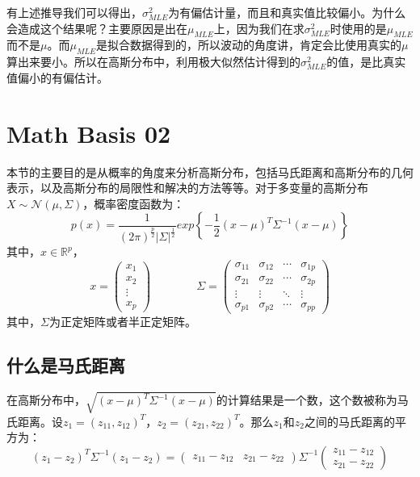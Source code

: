\documentclass[a4paper]{article}
\numberwithin{equation}{section}
\begin{document}
有上述推导我们可以得出，$\sigma^2_{MLE}$为有偏估计量，而且和真实值比较偏小。为什么会造成这个结果呢？主要原因是出在$\mu_{MLE}$上，因为我们在求$\sigma^2_{MLE}$时使用的是$\mu_{MLE}$而不是$\mu$。而$\mu_{MLE}$是拟合数据得到的，所以波动的角度讲，肯定会比使用真实的$\mu$算出来要小。所以在高斯分布中，利用极大似然估计得到的$\sigma^2_{MLE}$的值，是比真实值偏小的有偏估计。

\section{Math Basis 02 }

本节的主要目的是从概率的角度来分析高斯分布，包括马氏距离和高斯分布的几何表示，以及高斯分布的局限性和解决的方法等等。对于多变量的高斯分布$X\sim \mathcal{N}(\mu,\Sigma)$，概率密度函数为：
\begin{equation}
    p(x)=\frac{1}{(2\pi)^{\frac{p}{2}}|\Sigma|^{\frac{1}{2}}}exp\left\{ -\frac{1}{2}(x-\mu)^T\Sigma^{-1}(x-\mu) \right\}
\end{equation}
其中，$x\in\mathbb{R}^p$，
\begin{equation}
    x=
    \begin{pmatrix}
        x_1 \\
        x_2 \\
        \vdots \\
        x_p
    \end{pmatrix} \qquad \qquad
    \Sigma = 
    \begin{pmatrix}
        \sigma_{11} & \sigma_{12} & \cdots & \sigma_{1p} \\
        \sigma_{21} & \sigma_{22} & \cdots & \sigma_{2p} \\
        \vdots      & \vdots      & \ddots & \vdots      \\
        \sigma_{p1} & \sigma_{p2} & \cdots & \sigma_{pp}
        \end{pmatrix}
\end{equation}
其中，$\Sigma$为正定矩阵或者半正定矩阵。

\subsection{什么是马氏距离}
在高斯分布中，$\sqrt{(x-\mu)^T\Sigma^{-1}(x-\mu)}$的计算结果是一个数，这个数被称为马氏距离。设$z_1=(z_{11}, z_{12})^T$，$z_2=(z_{21}, z_{22})^T$。那么$z_1$和$z_2$之间的马氏距离的平方为：
\begin{equation}
    (z_1-z_2)^T\Sigma^{-1}(z_1-z_2)=
    \begin{pmatrix}
        z_{11}-z_{12} & z_{21}-z_{22}
    \end{pmatrix}
    \Sigma^{-1}
    \begin{pmatrix}
        z_{11}-z_{12} \\
        z_{21}-z_{22}
    \end{pmatrix}
\end{equation}
\end{document}
